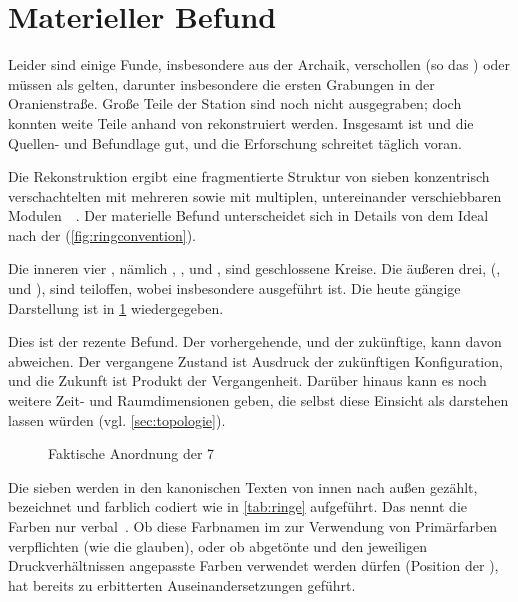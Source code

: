 \section{Materieller Befund}%
%

Leider sind einige Funde, insbesondere aus der Archaik, verschollen (so das ) oder müssen als  gelten, darunter insbesondere die ersten Grabungen in der Oranienstraße. 
Große Teile der Station sind noch nicht ausgegraben; doch konnten weite Teile anhand von  rekonstruiert werden. 
Insgesamt ist und die Quellen- und Befundlage gut, und die Erforschung schreitet täglich voran. 

Die Rekonstruktion ergibt eine fragmentierte Struktur von sieben konzentrisch verschachtelten  mit mehreren  sowie mit multiplen, untereinander verschiebbaren Modulen~\cite{cbasebook}~\cite{cbasepressemap}. 
Der materielle Befund unterscheidet sich in Details von dem Ideal nach der  (\cref{fig:ringconvention}). 

Die inneren vier , nämlich , ,  und , sind geschlossene Kreise. Die äußeren drei, (,  und ), sind teiloffen, wobei insbesondere   ausgeführt ist. Die heute gängige Darstellung ist in \cref{fig:cbaselogo} wiedergegeben.

Dies ist der rezente Befund. Der vorhergehende, und der zukünftige, kann davon abweichen. Der vergangene Zustand ist Ausdruck der zukünftigen Konfiguration, und die Zukunft ist Produkt der Vergangenheit. Darüber hinaus kann es noch weitere Zeit- und Raumdimensionen geben, die selbst diese Einsicht als  darstehen lassen würden (vgl. \cref{sec:topologie}).


\begin{figure}[ht!]
    \centering
        \resizebox{0.6\textwidth}{!}{
        
    }
    \caption{Faktische Anordnung der 7 }
    \label{fig:cbaselogo}
\end{figure}


    Die sieben   werden in den kanonischen Texten von innen nach außen gezählt, bezeichnet und  farblich codiert wie in  \cref{tab:ringe} aufgeführt. Das  nennt die Farben nur verbal~\cite[S.49]{cbasebook}. Ob diese Farbnamen im  zur Verwendung von Primärfarben verpflichten (wie die  glauben), oder ob abgetönte und den jeweiligen Druckverhältnissen angepasste Farben verwendet werden dürfen (Position der ), hat bereits zu erbitterten Auseinandersetzungen geführt. 
    
